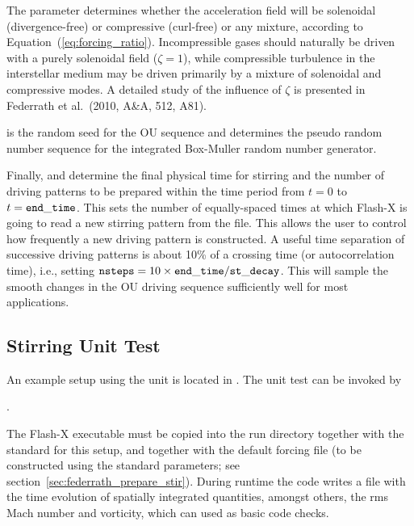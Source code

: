 The parameter  determines whether the acceleration field will be solenoidal (divergence-free)
or compressive (curl-free) or any mixture, according to Equation~(\ref{eq:forcing_ratio}). Incompressible gases
should naturally be driven with a purely solenoidal field ($\zeta=1$), while compressible turbulence in the
interstellar medium may be driven primarily by a mixture of solenoidal and compressive modes. A detailed study
of the influence of $\zeta$ is presented in Federrath et al.~(2010, A\&A, 512, A81).

 is the random seed for the OU sequence and determines the pseudo random number sequence for the
integrated Box-Muller random number generator.

Finally,  and  determine the final physical time for stirring and the number of
driving patterns to be prepared within the time period from $t=0$ to $t={\tt end\_time}$. This sets the number
of equally-spaced times at which Flash-X is going to read a new stirring pattern from the file. This allows the
user to control how frequently a new driving pattern is constructed. A useful time separation of successive
driving patterns is about 10\% of a crossing time (or autocorrelation time), i.e., setting
${\tt nsteps}=10\times{\tt end\_time}/{\tt st\_decay}$. This will sample the smooth changes in the OU
driving sequence sufficiently well for most applications.


\subsection{Stirring Unit Test}

An example setup using the  unit is located in .
The unit test can be invoked by

.

\noindent
The Flash-X executable must be copied into the run directory together with the standard 
for this setup, and together with the default forcing file (to be constructed using the standard parameters;
see section~\ref{sec:federrath_prepare_stir}). During runtime the code writes a file with the time evolution
of spatially integrated quantities, amongst others, the rms Mach number and vorticity, which can used as
basic code checks.





